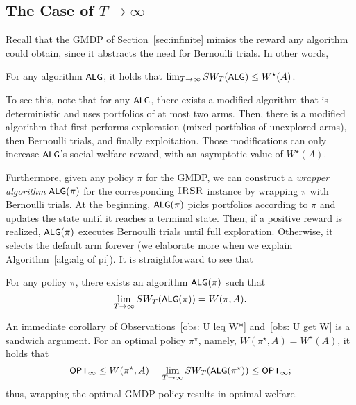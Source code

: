 \subsection{The Case of $T\rightarrow \infty$}
Recall that the GMDP of Section~\ref{sec:infinite} mimics the reward any algorithm could obtain, since it abstracts the need for Bernoulli trials. In other words, 
\begin{observation}\label{obs: U leq W*}
For any algorithm ${\small\textnormal{\textsf{ALG}}}$, it holds that $\lim_{T \rightarrow \infty }SW_T({\small\textnormal{\textsf{ALG}}}) \leq W^{\star}(A)$.
\end{observation}
To see this, note that for any ${\small\textnormal{\textsf{ALG}}}$, there exists a modified algorithm that is deterministic and uses portfolios of at most two arms. Then, there is a modified algorithm that first performs exploration (mixed portfolios of unexplored arms), then Bernoulli trials, and finally exploitation. Those modifications can only increase ${\small\textnormal{\textsf{ALG}}}$'s social welfare reward, with an asymptotic value of $W^{\star}(A)$.


Furthermore, given any policy $\pi$ for the GMDP, we can construct a \emph{wrapper algorithm} ${\small\textnormal{\textsf{ALG}}}(\pi)$ for the corresponding $\textsc{IRSR}$ instance by wrapping $\pi$ with Bernoulli trials. At the beginning, ${\small\textnormal{\textsf{ALG}}}(\pi)$ picks portfolios according to $\pi$ and updates the state until it reaches a terminal state. Then, if a positive reward is realized, ${\small\textnormal{\textsf{ALG}}}(\pi)$ executes Bernoulli trials until full exploration. Otherwise, it selects the default arm forever (we elaborate more when we explain Algorithm~\ref{alg:alg of pi}). It is straightforward to see that
\begin{observation}\label{obs: U get W}
For any policy $\pi$, there exists an algorithm ${\small\textnormal{\textsf{ALG}}}(\pi)$ such that 
\[
\lim_{T \rightarrow \infty }SW_T({\small\textnormal{\textsf{ALG}}}(\pi)) = W(\pi,A).
\]
\end{observation}
An immediate corollary of Observations~\ref{obs: U leq W*} and~\ref{obs: U get W} is a sandwich argument. For an optimal policy $\pi^\star$, namely, $W(\pi^\star,A)=W^{\star}(A)$, it holds that
\begin{equation}\label{eq:sandwith}
{\small\textnormal{\textsf{OPT}}}_{\infty} \leq W(\pi^\star,A) = \lim_{T\rightarrow \infty}SW_T({\small\textnormal{\textsf{ALG}}}(\pi^\star))  \leq  {\small\textnormal{\textsf{OPT}}}_{\infty};  
\end{equation}
thus, wrapping the optimal GMDP policy results in optimal welfare. 


